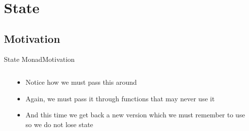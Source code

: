 \section{State}
\subsection{Motivation}
\begin{frame}[fragile]{State Monad}{Motivation}
  \begin{columns}[t]
    \begin{column}{.55\textwidth}
      {\tiny\inputminted[escapeinside=\\`\\`,breaklines,breakafter=>]{haskell}{state-motivation.hs}}
    \end{column}
    \begin{column}{.4\textwidth}
      \begin{itemize}
        \item Notice how we must pass this \texttt{} around
        \item Again, we must pass it through functions that may never use it
        \item And this time we get back a new version which we must remember to use so we do not lose state
      \end{itemize}
    \end{column}
  \end{columns}
\end{frame}
